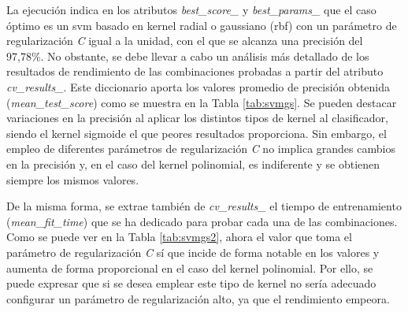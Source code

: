\vspace{3mm}

La ejecución indica en los atributos \textit{best\_score\_} y \textit{best\_params\_} que el caso óptimo es un \gls{svm} basado en kernel radial o gaussiano (\gls{rbf}) con un parámetro de regularización \textit{C} igual a la unidad, con el que se alcanza una precisión del 97,78\%. No obstante, se debe llevar a cabo un análisis más detallado de los resultados de rendimiento de las combinaciones probadas a partir del atributo \textit{cv\_results\_}. Este diccionario aporta los valores promedio de precisión obtenida (\textit{mean\_test\_score}) como se muestra en la Tabla \ref{tab:svmgs}. Se pueden destacar variaciones en la precisión al aplicar los distintos tipos de kernel al clasificador, siendo el kernel sigmoide el que peores resultados proporciona. Sin embargo, el empleo de diferentes parámetros de regularización \textit{C} no implica grandes cambios en la precisión y, en el caso del kernel polinomial, es indiferente y se obtienen siempre los mismos valores. 

\vspace{3mm}

De la misma forma, se extrae también de \textit{cv\_results\_} el tiempo de entrenamiento (\textit{mean\_fit\_time}) que se ha dedicado para probar cada una de las combinaciones. Como se puede ver en la Tabla \ref{tab:svmgs2}, ahora el valor que toma el parámetro de regularización \textit{C} sí que incide de forma notable en los valores y aumenta de forma proporcional en el caso del kernel polinomial. Por ello, se puede expresar que si se desea emplear este tipo de kernel no sería adecuado configurar un parámetro de regularización alto, ya que el rendimiento empeora. 

\vspace{3mm}

